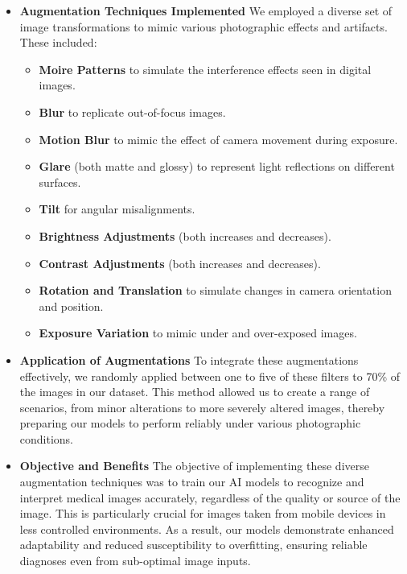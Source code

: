 \begin{itemize}
    \item 
    \textbf{Augmentation Techniques Implemented}
    We employed a diverse set of image transformations to mimic various photographic effects and artifacts. These included:
    \begin{itemize}
        \item \textbf{Moire Patterns} to simulate the interference effects seen in digital images.
        \item \textbf{Blur} to replicate out-of-focus images.
        \item \textbf{Motion Blur} to mimic the effect of camera movement during exposure.
        \item \textbf{Glare} (both matte and glossy) to represent light reflections on different surfaces.
        \item \textbf{Tilt} for angular misalignments.
        \item \textbf{Brightness Adjustments} (both increases and decreases).
        \item \textbf{Contrast Adjustments} (both increases and decreases).
        \item \textbf{Rotation and Translation} to simulate changes in camera orientation and position.
        \item \textbf{Exposure Variation} to mimic under and over-exposed images.
    \end{itemize} 

    \item \textbf{Application of Augmentations}
    To integrate these augmentations effectively, we randomly applied between one to five of these filters to 70\% of the images in our dataset. This method allowed us to create a range of scenarios, from minor alterations to more severely altered images, thereby preparing our models to perform reliably under various photographic conditions.
    
    \item 
    \textbf{Objective and Benefits}
    The objective of implementing these diverse augmentation techniques was to train our AI models to recognize and interpret medical images accurately, regardless of the quality or source of the image. This is particularly crucial for images taken from mobile devices in less controlled environments. As a result, our models demonstrate enhanced adaptability and reduced susceptibility to overfitting, ensuring reliable diagnoses even from sub-optimal image inputs.
\end{itemize}



